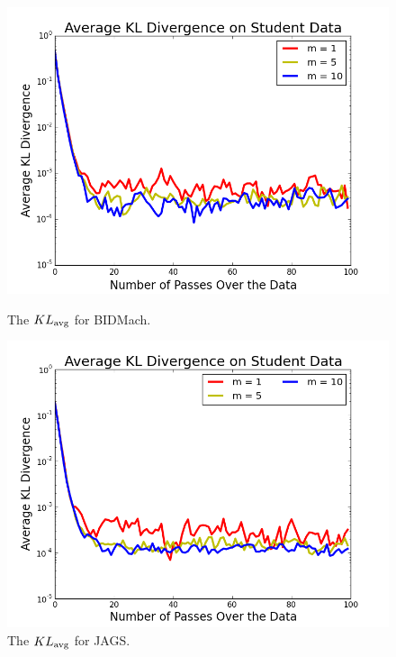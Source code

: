 \documentclass{article} %
\begin{document}
\begin{figure}[t]
  \centering
  \begin{minipage}{.5\textwidth}
    \centering
    \includegraphics[width=1\textwidth]{fig_kldiv_twobatches}
    \caption{The $KL_{\rm avg}$ for BIDMach.}
    \label{fig:kl_bidmach}
  \end{minipage}\hfill
    \begin{minipage}{.5\textwidth}
    \centering
    \includegraphics[width=1\textwidth]{fig_kl_div_25_50_perc_jags}
    \caption{The $KL_{\rm avg}$ for JAGS.}
    \label{fig:kl_jags}
  \end{minipage}
\end{figure}
\end{document}
